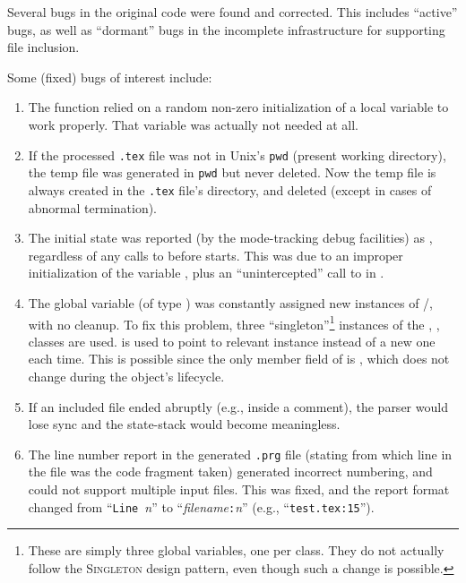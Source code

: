 \documentclass[twoside,12pt]{article}
\begin{document}
Several bugs in the original code were found and corrected.
This includes ``active'' bugs, as well as ``dormant'' bugs in the incomplete
    infrastructure for supporting file inclusion.

Some (fixed) bugs of interest include:

\begin{enumerate}

\item
The \PROGde{} function relied on a random non-zero initialization of a local
    variable to work properly.
That variable was actually not needed at all.

\item
If the processed \texttt{.tex} file was not in Unix's \texttt{pwd} (present working
    directory), the temp file was generated in \texttt{pwd} but never deleted.
Now the temp file is always created in the \texttt{.tex} file's directory, and
    deleted (except in cases of abnormal termination).

\item
The initial state was reported (by the mode-tracking debug facilities) as \PROGdf{},
    regardless of any calls to \PROGdg{} before \PROGdh{} starts.
This was due to an improper initialization of the variable \PROGdi{}, plus an
    ``unintercepted'' call to \PROGdj{} in \PROGea{}.

\item
The global variable \PROGeb{} (of type \PROGec{}) was constantly assigned new
    instances of \PROGed{}/\PROGee{}, with no cleanup.
To fix this problem, three ``singleton''\footnote{These are simply three global
variables, one per class. They do not actually follow the \textsc{Singleton} design pattern,
even though such a change is possible.} instances of the \PROGef{}, \PROGeg{}, \PROGeh{}
    classes are used.
\PROGei{} is used to point to relevant instance instead of a new one each time.
This is possible since the only member field of \PROGej{} is \PROGfa{}, which does not
    change during the object's lifecycle.

\item
If an included file ended abruptly (e.g., inside a comment), the parser would lose sync
    and the state-stack would become meaningless.

\item
The line number report in the generated \texttt{.prg} file (stating from which line in
    the file was the code fragment taken) generated incorrect numbering, and could not
    support multiple input files.
This was fixed, and the report format changed from ``\texttt{Line }\textit{n}'' to
    ``\textit{filename}\texttt{:}\textit{n}'' (e.g., ``\texttt{test.tex:15}'').


\end{enumerate}
\end{document}
